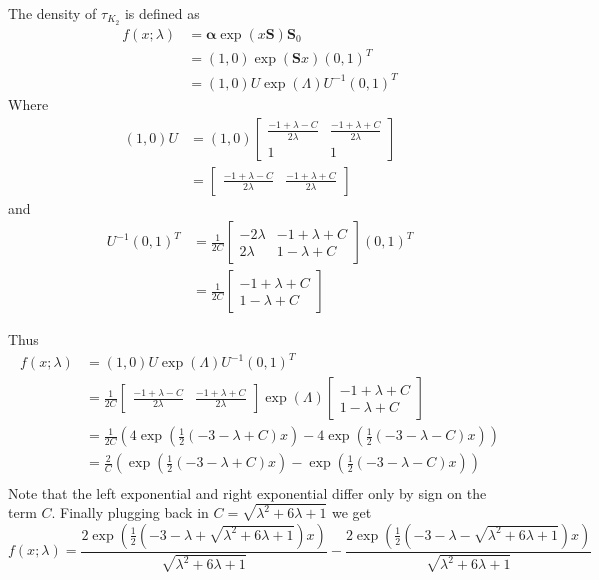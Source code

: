 The density of $\tau_{K_2}$ is defined as
\begin{align*}
 f(x; \lambda) &= \boldsymbol{\alpha} \exp(x \mathbf{S}) \mathbf{S}_0 \nonumber\\
 &= (1, 0) \exp(\mathbf{S} x) (0,1)^T \\
 &= (1, 0) U \exp(\Lambda) U^{-1} (0,1)^T
\end{align*}
Where
\begin{align*}
    (1,0) U &= (1,0) \begin{bmatrix}
    \frac{-1 + \lambda - C}{2\lambda} & \frac{-1 + \lambda + C}{2\lambda}\\
    1 & 1
\end{bmatrix}\\
    &= \begin{bmatrix}
    \frac{-1 + \lambda - C}{2\lambda} & \frac{-1 + \lambda + C}{2\lambda}
    \end{bmatrix}
\end{align*}
and
\begin{align*}
    U^{-1} (0,1)^T &= \frac{1}{2C} \begin{bmatrix}
    -2\lambda & -1 + \lambda + C\\
    2\lambda & 1 - \lambda + C
    \end{bmatrix} (0,1)^T\\
    &= \frac{1}{2C} \begin{bmatrix}
    -1 + \lambda + C\\
    1 - \lambda + C
    \end{bmatrix}
\end{align*}

Thus
\begin{align*}
     f(x; \lambda) &= (1, 0) U \exp(\Lambda) U^{-1} (0,1)^T\\
     &= \frac{1}{2C} \begin{bmatrix}
    \frac{-1 + \lambda - C}{2\lambda} & \frac{-1 + \lambda + C}{2\lambda}
    \end{bmatrix} \exp(\Lambda)  \begin{bmatrix}
    -1 + \lambda + C\\
    1 - \lambda + C
    \end{bmatrix}\\
    &= \frac{1}{2C} \left( 4 \exp\left(\frac{1}{2}(-3 - \lambda + C) x\right) - 4 \exp\left(\frac{1}{2}(-3 - \lambda - C) x\right) \right)\\
    &= \frac{2}{C} \left( \exp\left(\frac{1}{2}(-3 - \lambda + C) x\right) - \exp\left(\frac{1}{2}(-3 - \lambda - C) x\right) \right)\\
\end{align*}
Note that the left exponential and right exponential differ only by sign on the term $C$.
Finally plugging back in $C = \sqrt{\lambda^2 + 6 \lambda + 1}$ we get
\begin{equation} \label{eq:t_density}
      f(x; \lambda) = \frac{2 \exp\left(\frac{1}{2}(-3 - \lambda + \sqrt{\lambda^2 + 6 \lambda + 1}) x\right)}{\sqrt{\lambda^2 + 6 \lambda + 1}}  - \frac{2 \exp\left(\frac{1}{2}(-3 - \lambda - \sqrt{\lambda^2 + 6 \lambda + 1}) x\right)}{\sqrt{\lambda^2 + 6 \lambda + 1}}
\end{equation}

